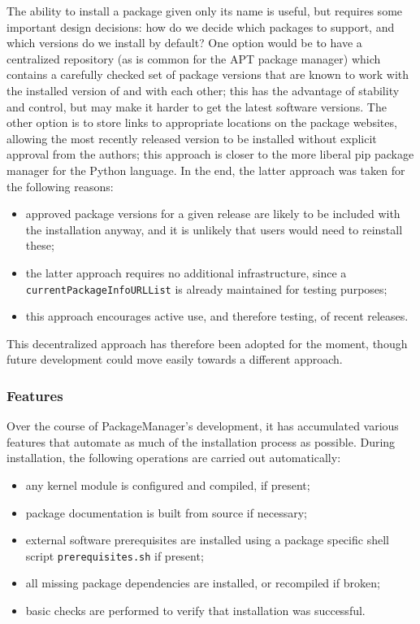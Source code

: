 The ability to install a package given only its name is useful, but requires
some important design decisions: how do we decide which packages to support, and
which versions do we install by default?  One option would be to have a
centralized repository (as is common for the {\sf APT} package manager) which
contains a carefully checked set of package versions that are known to work with
the installed version of \GAP and with each other; this has the advantage of
stability and control, but may make it harder to get the latest software
versions.  The other option is to store links to appropriate locations on the
package websites, allowing the most recently released version to be installed
without explicit approval from the \GAP authors; this approach is closer to the
more liberal {\sf pip} package manager for the Python language.
In the end, the latter approach was taken for the following reasons:
\begin{itemize}
\item approved package versions for a given release are likely to be included
  with the \GAP installation anyway, and it is unlikely that users would need
  to reinstall these;
\item the latter approach requires no additional infrastructure, since a
  \texttt{currentPackageInfoURLList} is already maintained for testing purposes;
\item this approach encourages active use, and therefore testing, of recent releases.
\end{itemize}
This decentralized approach has therefore been adopted for the moment, though
future development could move easily towards a different approach.

\subsubsection{Features}

Over the course of {\sf PackageManager}'s development, it has accumulated
various features that automate as much of the installation process as possible.
During installation, the following operations are carried out automatically:
\begin{itemize}
\item any kernel module is configured and compiled, if present;
\item package documentation is built from source if necessary;
\item external software prerequisites are installed using a package
  specific shell script \texttt{prerequisites.sh} if present;
\item all missing package dependencies are installed, or recompiled if broken;
\item basic checks are performed to verify that installation was successful.
\end{itemize}

